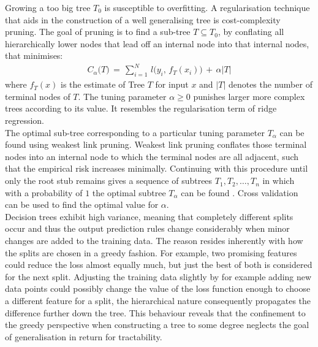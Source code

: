 \documentclass[a4paper, 11pt]{article}
\begin{document}
Growing a too big tree $T_0$ is susceptible to overfitting. A regularisation technique that aids in the construction of a well generalising tree is cost-complexity pruning. The goal of pruning is to find a sub-tree $T \subseteq T_0$, by conflating all hierarchically lower nodes that lead off an internal node into that internal nodes, that minimises:
\begin{align*}
C_\alpha\big(T\big)\, =\, \sum_{i = 1}^{N}\, l\big(y_i,\, f_T(x_i)\big)\, +\, \alpha |T|
\end{align*}
where $f_T(x)$ is the estimate of Tree $T$ for input $x$ and $|T|$ denotes the number of terminal nodes of $T$. The tuning parameter $\alpha \geq 0$ punishes larger more complex trees according to its value. It resembles the regularisation term of ridge regression. \\
The optimal sub-tree corresponding to a particular tuning parameter $T_{\alpha}$ can be found using weakest link pruning. Weakest link pruning conflates those terminal nodes into an internal node to which the terminal nodes are all adjacent, such that the empirical risk increases minimally. Continuing with this procedure until only the root stub remains gives a sequence of subtrees $T_1, T_2, \ldots, T_n$ in which with a probability of $1$ the optimal subtree $T_{\alpha}$ can be found \parencite{breiman1984classification}. Cross validation can be used to find the optimal value for $\alpha$.\\

Decision trees exhibit high variance, meaning that completely different splits occur and thus the output prediction rules change considerably when minor changes are added to the training data. The reason resides inherently with how the splits are chosen in a greedy fashion. For example, two promising features could reduce the loss almost equally much, but just the best of both is considered for the next split. Adjusting the training data slightly by for example adding new data points could possibly change the value of the loss function enough to choose a different feature for a split, the hierarchical nature consequently propagates the difference further down the tree. This behaviour reveals that the confinement to the greedy perspective when constructing a tree to some degree neglects the goal of generalisation in return for tractability.\\ 
\end{document}
